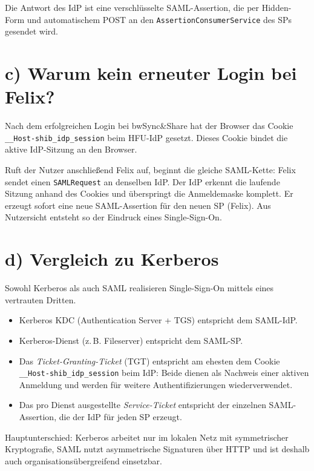 \documentclass[
	fontsize=12pt,
	paper=a4,
	numbers=noenddot,
	listof=totoc,
	listof=entryprefix,
	listof=nochaptergap,
	bibliography=totoc,
	parskip=half,
	openany
]{scrbook}
\begin{document}
Die Antwort des IdP ist eine verschlüsselte SAML-Assertion, die per Hidden-Form und automatischem POST an den \texttt{AssertionConsumerService} des SPs gesendet wird.

\section*{c) Warum kein erneuter Login bei Felix?}

Nach dem erfolgreichen Login bei bwSync\&Share hat der Browser das Cookie\\ \texttt{\_\_Host-shib\_idp\_session} beim HFU-IdP gesetzt.
Dieses Cookie bindet die aktive IdP-Sitzung an den Browser.

Ruft der Nutzer anschließend Felix auf, beginnt die gleiche SAML-Kette: Felix sendet einen \texttt{SAMLRequest} an denselben IdP.
Der IdP erkennt die laufende Sitzung anhand des Cookies und überspringt die Anmeldemaske komplett.
Er erzeugt sofort eine neue SAML-Assertion für den neuen SP (Felix).
Aus Nutzersicht entsteht so der Eindruck eines Single-Sign-On.

\section*{d) Vergleich zu Kerberos}

Sowohl Kerberos als auch SAML realisieren Single-Sign-On mittels eines vertrauten Dritten.

\begin{itemize}
	\item Kerberos KDC (Authentication Server + TGS) entspricht dem SAML-IdP.
	\item Kerberos-Dienst (z.\,B. Fileserver) entspricht dem SAML-SP.
	\item Das \emph{Ticket-Granting-Ticket} (TGT) entspricht am ehesten dem Cookie\\ \texttt{\_\_Host-shib\_idp\_session} beim IdP: Beide dienen als Nachweis einer aktiven Anmeldung und werden für weitere Authentifizierungen wiederverwendet.
	\item Das pro Dienst ausgestellte \emph{Service-Ticket} entspricht der einzelnen SAML-Assertion, die der IdP für jeden SP erzeugt.
\end{itemize}

Hauptunterschied: Kerberos arbeitet nur im lokalen Netz mit symmetrischer Kryptografie, SAML nutzt asymmetrische Signaturen über HTTP und ist deshalb auch organisationsübergreifend einsetzbar.
\end{document}
